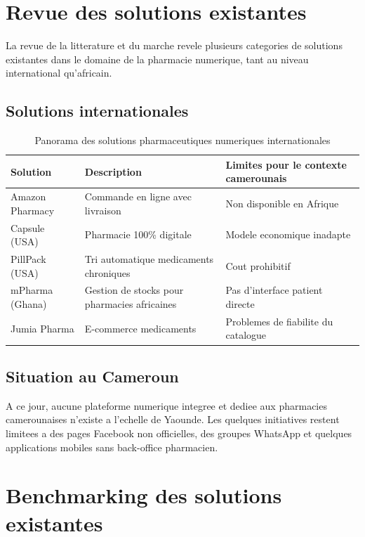 \documentclass[12pt,a4paper]{report}
\begin{document}
\section{Revue des solutions existantes}

La revue de la litterature et du marche revele plusieurs categories de solutions existantes dans le domaine de la pharmacie numerique, tant au niveau international qu'africain.

\subsection{Solutions internationales}

\begin{table}[ht]
\centering
\caption{Panorama des solutions pharmaceutiques numeriques internationales}
\renewcommand{\arraystretch}{1.4}
\begin{tabularx}{\textwidth}{|l|X|X|}
\hline
\rowcolor{vertpharma!20}
\textbf{Solution} & \textbf{Description} & \textbf{Limites pour le contexte camerounais} \\ \hline
Amazon Pharmacy & Commande en ligne avec livraison & Non disponible en Afrique \\ \hline
Capsule (USA) & Pharmacie 100\% digitale & Modele economique inadapte \\ \hline
PillPack (USA) & Tri automatique medicaments chroniques & Cout prohibitif \\ \hline
mPharma (Ghana) & Gestion de stocks pour pharmacies africaines & Pas d'interface patient directe \\ \hline
Jumia Pharma & E-commerce medicaments & Problemes de fiabilite du catalogue \\ \hline
\end{tabularx}
\end{table}

\subsection{Situation au Cameroun}

A ce jour, aucune plateforme numerique integree et dediee aux pharmacies camerounaises n'existe a l'echelle de Yaounde. Les quelques initiatives restent limitees a des pages Facebook non officielles, des groupes WhatsApp et quelques applications mobiles sans back-office pharmacien.

\section{Benchmarking des solutions existantes}
\end{document}
